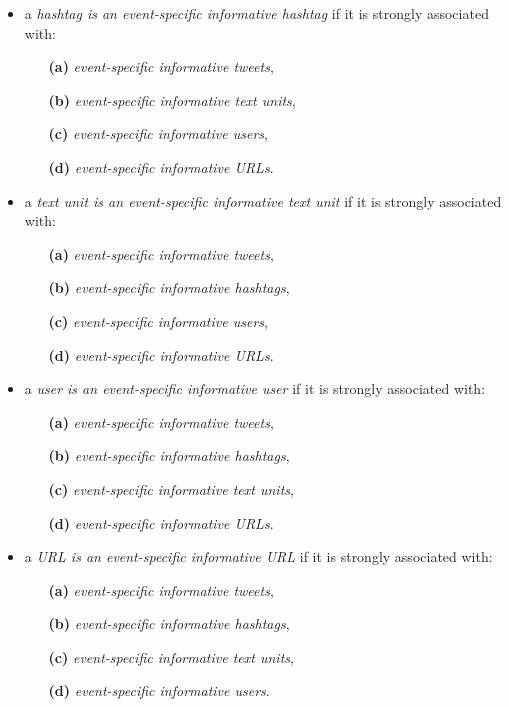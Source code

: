 \begin{itemize} 
\item a \textit{hashtag is an event-specific informative hashtag} if it is strongly associated with:
\begin{itemize}
\item[\textbf{(a)}] \textit{event-specific informative tweets},
\item[\textbf{(b)}] \textit{event-specific informative text units},
\item[\textbf{(c)}] \textit{event-specific informative users},
\item[\textbf{(d)}] \textit{event-specific informative URLs}.
\end{itemize}
\end{itemize}

\begin{itemize} 
\item a \textit{text unit is an event-specific informative text unit} if it is strongly associated with:
\begin{itemize}
\item[\textbf{(a)}] \textit{event-specific informative tweets}, 
\item[\textbf{(b)}] \textit{event-specific informative hashtags}, 
\item[\textbf{(c)}] \textit{event-specific informative users}, 
\item[\textbf{(d)}] \textit{event-specific informative URLs}. 
\end{itemize}
\end{itemize}

\begin{itemize} 
\item a \textit{user is an event-specific informative user} if it is strongly associated with:
\begin{itemize}
\item[\textbf{(a)}] \textit{event-specific informative tweets}, 
\item[\textbf{(b)}] \textit{event-specific informative hashtags}, 
\item[\textbf{(c)}] \textit{event-specific informative text units},
\item[\textbf{(d)}] \textit{event-specific informative URLs}. 
\end{itemize}
\end{itemize}

\begin{itemize} \item a \textit{URL is an event-specific informative URL} if it is strongly associated with:
\begin{itemize}
\item[\textbf{(a)}] \textit{event-specific informative tweets}, 
\item[\textbf{(b)}] \textit{event-specific informative hashtags}, 
\item[\textbf{(c)}] \textit{event-specific informative text units},
\item[\textbf{(d)}] \textit{event-specific informative users}. 
\end{itemize}
\end{itemize}

